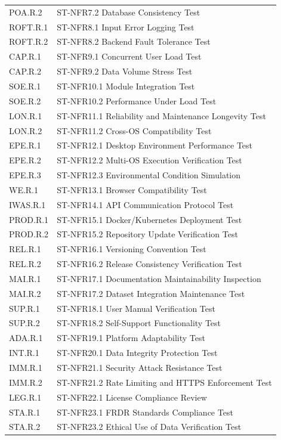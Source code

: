 \documentclass[12pt, titlepage]{article}
\begin{document}
\begin{flushleft}
\begin{longtable}{|l|p{10cm}|}
POA.R.2 & ST-NFR7.2 Database Consistency Test \\
ROFT.R.1 & ST-NFR8.1 Input Error Logging Test \\
ROFT.R.2 & ST-NFR8.2 Backend Fault Tolerance Test \\
CAP.R.1 & ST-NFR9.1 Concurrent User Load Test \\
CAP.R.2 & ST-NFR9.2 Data Volume Stress Test \\
SOE.R.1 & ST-NFR10.1 Module Integration Test \\
SOE.R.2 & ST-NFR10.2 Performance Under Load Test \\
LON.R.1 & ST-NFR11.1 Reliability and Maintenance Longevity Test \\
LON.R.2 & ST-NFR11.2 Cross-OS Compatibility Test \\
EPE.R.1 & ST-NFR12.1 Desktop Environment Performance Test \\
EPE.R.2 & ST-NFR12.2 Multi-OS Execution Verification Test \\
EPE.R.3 & ST-NFR12.3 Environmental Condition Simulation \\
WE.R.1 & ST-NFR13.1 Browser Compatibility Test \\
IWAS.R.1 & ST-NFR14.1 API Communication Protocol Test \\
PROD.R.1 & ST-NFR15.1 Docker/Kubernetes Deployment Test \\
PROD.R.2 & ST-NFR15.2 Repository Update Verification Test \\
REL.R.1 & ST-NFR16.1 Versioning Convention Test \\
REL.R.2 & ST-NFR16.2 Release Consistency Verification Test \\
MAI.R.1 & ST-NFR17.1 Documentation Maintainability Inspection \\
MAI.R.2 & ST-NFR17.2 Dataset Integration Maintenance Test \\
SUP.R.1 & ST-NFR18.1 User Manual Verification Test \\
SUP.R.2 & ST-NFR18.2 Self-Support Functionality Test \\
ADA.R.1 & ST-NFR19.1 Platform Adaptability Test \\
INT.R.1 & ST-NFR20.1 Data Integrity Protection Test \\
IMM.R.1 & ST-NFR21.1 Security Attack Resistance Test \\
IMM.R.2 & ST-NFR21.2 Rate Limiting and HTTPS Enforcement Test \\
LEG.R.1 & ST-NFR22.1 License Compliance Review \\
STA.R.1 & ST-NFR23.1 FRDR Standards Compliance Test \\
STA.R.2 & ST-NFR23.2 Ethical Use of Data Verification Test \\


\end{longtable}
\end{flushleft}
\end{document}
